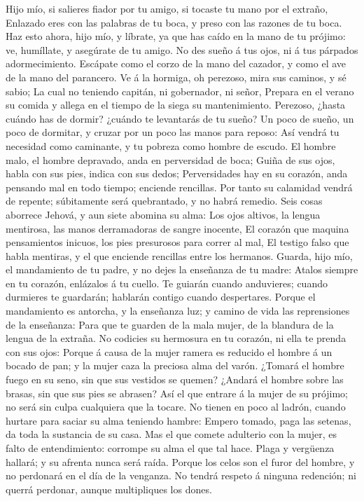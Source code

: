  Hijo mío, si salieres fiador por tu amigo, si tocaste tu
mano por el extraño,  Enlazado eres con las palabras de tu
boca, y preso con las razones de tu boca.  Haz esto ahora,
hijo mío, y líbrate, ya que has caído en la mano de tu prójimo: ve,
humíllate, y asegúrate de tu amigo.  No des sueño á tus
ojos, ni á tus párpados adormecimiento.  Escápate como el
corzo de la mano del cazador, y como el ave de la mano del parancero.
 Ve á la hormiga, oh perezoso, mira sus caminos, y sé sabio;
 La cual no teniendo capitán, ni gobernador, ni señor,
 Prepara en el verano su comida y allega en el tiempo de la
siega su mantenimiento.  Perezoso, ¿hasta cuándo has de
dormir? ¿cuándo te levantarás de tu sueño?  Un poco de
sueño, un poco de dormitar, y cruzar por un poco las manos para reposo:
 Así vendrá tu necesidad como caminante, y tu pobreza como
hombre de escudo.  El hombre malo, el hombre depravado,
anda en perversidad de boca;  Guiña de sus ojos, habla con
sus pies, indica con sus dedos;  Perversidades hay en su
corazón, anda pensando mal en todo tiempo; enciende rencillas.
 Por tanto su calamidad vendrá de repente; súbitamente será
quebrantado, y no habrá remedio.  Seis cosas aborrece
Jehová, y aun siete abomina su alma:  Los ojos altivos, la
lengua mentirosa, las manos derramadoras de sangre inocente,
 El corazón que maquina pensamientos inicuos, los pies
presurosos para correr al mal,  El testigo falso que habla
mentiras, y el que enciende rencillas entre los hermanos. 
Guarda, hijo mío, el mandamiento de tu padre, y no dejes la enseñanza de
tu madre:  Atalos siempre en tu corazón, enlázalos á tu
cuello.  Te guiarán cuando anduvieres; cuando durmieres te
guardarán; hablarán contigo cuando despertares.  Porque el
mandamiento es antorcha, y la enseñanza luz; y camino de vida las
reprensiones de la enseñanza:  Para que te guarden de la
mala mujer, de la blandura de la lengua de la extraña.  No
codicies su hermosura en tu corazón, ni ella te prenda con sus ojos:
 Porque á causa de la mujer ramera es reducido el hombre á
un bocado de pan; y la mujer caza la preciosa alma del varón.
 ¿Tomará el hombre fuego en su seno, sin que sus vestidos
se quemen?  ¿Andará el hombre sobre las brasas, sin que sus
pies se abrasen?  Así el que entrare á la mujer de su
prójimo; no será sin culpa cualquiera que la tocare.  No
tienen en poco al ladrón, cuando hurtare para saciar su alma teniendo
hambre:  Empero tomado, paga las setenas, da toda la
sustancia de su casa.  Mas el que comete adulterio con la
mujer, es falto de entendimiento: corrompe su alma el que tal hace.
 Plaga y vergüenza hallará; y su afrenta nunca será raída.
 Porque los celos son el furor del hombre, y no perdonará
en el día de la venganza.  No tendrá respeto á ninguna
redención; ni querrá perdonar, aunque multipliques los dones.

